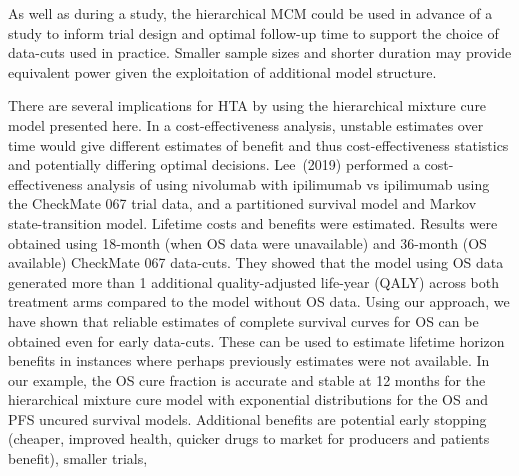 \documentclass[AMA,STIX1COL]{WileyNJD-v2}
\begin{document}
As well as during a study, the hierarchical MCM could be used in advance of a study to inform trial design and optimal follow-up time to support the choice of data-cuts used in practice. Smaller sample sizes and shorter duration may provide equivalent power given the exploitation of additional model structure.

There are several implications for HTA by using the hierarchical mixture cure model presented here.
In a cost-effectiveness analysis, unstable estimates over time would give different estimates of benefit and thus cost-effectiveness statistics and potentially differing optimal decisions.
Lee~(2019)\cite{Lee2019} performed a cost-effectiveness analysis of using nivolumab with ipilimumab vs ipilimumab using the CheckMate 067 trial data, and a partitioned survival model and Markov state-transition model. Lifetime costs and benefits were estimated.
Results were obtained using 18-month (when OS data were unavailable) and 36-month (OS available) CheckMate 067 data-cuts. They showed that the model using OS data generated more than 1 additional quality-adjusted life-year (QALY) across both treatment arms compared to the model without OS data.
Using our approach, we have shown that reliable estimates of complete survival curves for OS can be obtained even for early data-cuts. These can be used to estimate lifetime horizon benefits in instances where perhaps previously estimates were not available.
In our example, the OS cure fraction is accurate and stable at 12 months for the hierarchical mixture cure model with exponential distributions for the OS and PFS uncured survival models.
Additional benefits are potential early stopping (cheaper, improved health, quicker drugs to market for producers and patients benefit), smaller trials,


\end{document}
